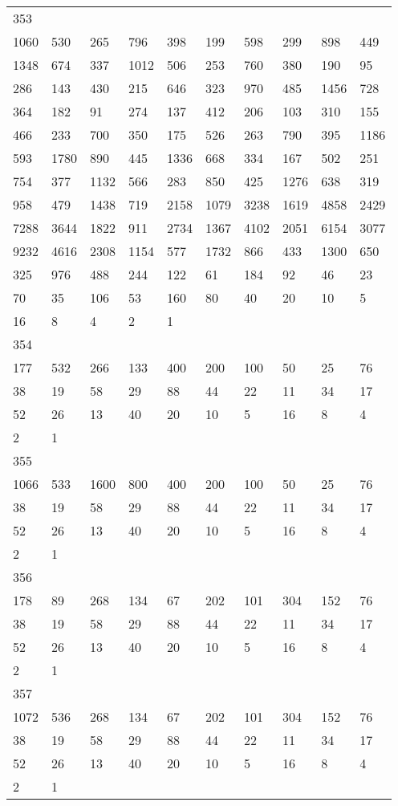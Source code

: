\begin{longtable}{*{10}{l}}
353&&&&&&&&&\\
1060& 530& 265& 796& 398& 199& 598& 299& 898& 449\\
1348& 674& 337& 1012& 506& 253& 760& 380& 190& 95\\
286& 143& 430& 215& 646& 323& 970& 485& 1456& 728\\
364& 182& 91& 274& 137& 412& 206& 103& 310& 155\\
466& 233& 700& 350& 175& 526& 263& 790& 395& 1186\\
593& 1780& 890& 445& 1336& 668& 334& 167& 502& 251\\
754& 377& 1132& 566& 283& 850& 425& 1276& 638& 319\\
958& 479& 1438& 719& 2158& 1079& 3238& 1619& 4858& 2429\\
7288& 3644& 1822& 911& 2734& 1367& 4102& 2051& 6154& 3077\\
9232& 4616& 2308& 1154& 577& 1732& 866& 433& 1300& 650\\
325& 976& 488& 244& 122& 61& 184& 92& 46& 23\\
70& 35& 106& 53& 160& 80& 40& 20& 10& 5\\
16& 8& 4& 2& 1& \\

354&&&&&&&&&\\
177& 532& 266& 133& 400& 200& 100& 50& 25& 76\\
38& 19& 58& 29& 88& 44& 22& 11& 34& 17\\
52& 26& 13& 40& 20& 10& 5& 16& 8& 4\\
2& 1& \\

355&&&&&&&&&\\
1066& 533& 1600& 800& 400& 200& 100& 50& 25& 76\\
38& 19& 58& 29& 88& 44& 22& 11& 34& 17\\
52& 26& 13& 40& 20& 10& 5& 16& 8& 4\\
2& 1& \\

356&&&&&&&&&\\
178& 89& 268& 134& 67& 202& 101& 304& 152& 76\\
38& 19& 58& 29& 88& 44& 22& 11& 34& 17\\
52& 26& 13& 40& 20& 10& 5& 16& 8& 4\\
2& 1& \\

357&&&&&&&&&\\
1072& 536& 268& 134& 67& 202& 101& 304& 152& 76\\
38& 19& 58& 29& 88& 44& 22& 11& 34& 17\\
52& 26& 13& 40& 20& 10& 5& 16& 8& 4\\
2& 1& \\


\end{longtable}
